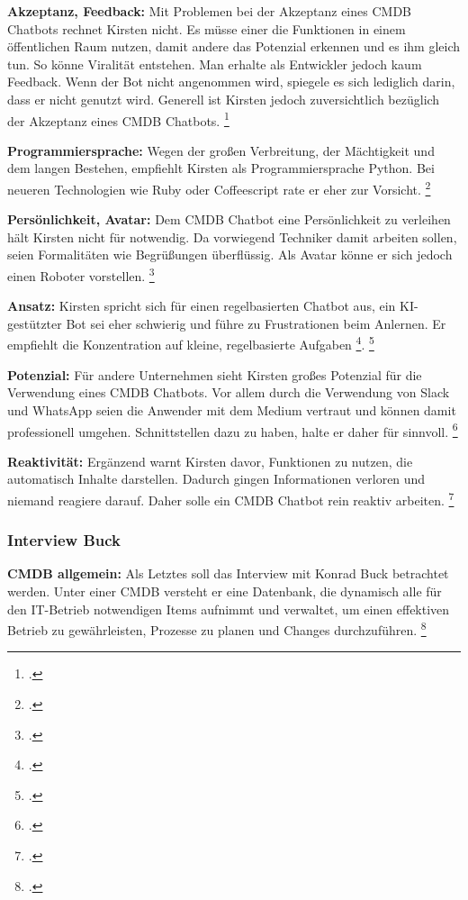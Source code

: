 \textbf{Akzeptanz, Feedback: }Mit Problemen bei der Akzeptanz eines \acs{CMDB} Chatbots rechnet Kirsten nicht. Es müsse einer die Funktionen in einem öffentlichen Raum nutzen, damit andere das Potenzial erkennen und es ihm gleich tun. So könne Viralität entstehen. Man erhalte als Entwickler jedoch kaum Feedback. Wenn der Bot nicht angenommen wird, spiegele es sich lediglich darin, dass er nicht genutzt wird. Generell ist Kirsten jedoch zuversichtlich bezüglich der Akzeptanz eines \acs{CMDB} Chatbots.
\footcite[Vgl.][o. \pno]{Kirsten_2019}

\textbf{Programmiersprache: }Wegen der großen Verbreitung, der Mächtigkeit und dem langen Bestehen, empfiehlt Kirsten als Programmiersprache Python. Bei neueren Technologien wie Ruby oder Coffeescript rate er eher zur Vorsicht. 
\footcite[Vgl.][o. \pno]{Kirsten_2019}

\textbf{Persönlichkeit, Avatar: }Dem CMDB Chatbot eine Persönlichkeit zu verleihen hält Kirsten nicht für notwendig. Da vorwiegend Techniker damit arbeiten sollen, seien Formalitäten wie Begrüßungen überflüssig. Als Avatar könne er sich jedoch einen Roboter vorstellen. 
\footcite[Vgl.][o. \pno]{Kirsten_2019}

\textbf{Ansatz: }Kirsten spricht sich für einen regelbasierten Chatbot aus, ein KI-gestützter Bot sei eher schwierig und führe zu Frustrationen beim Anlernen. Er empfiehlt die Konzentration auf \glqq{}kleine, regelbasierte Aufgaben\grqq
\footcite[][o. \pno]{Kirsten_2019}.{}
\footcite[Vgl.][o. \pno]{Kirsten_2019}

\textbf{Potenzial: }Für andere Unternehmen sieht Kirsten großes Potenzial für die Verwendung eines \acs{CMDB} Chatbots. Vor allem durch die Verwendung von Slack und WhatsApp seien die Anwender mit dem Medium vertraut und können damit professionell umgehen. Schnittstellen dazu zu haben, halte er daher für sinnvoll.
\footcite[Vgl.][o. \pno]{Kirsten_2019}

\textbf{Reaktivität: }Ergänzend warnt Kirsten davor, Funktionen zu nutzen, die automatisch Inhalte darstellen. Dadurch gingen Informationen verloren und niemand reagiere darauf. Daher solle ein \acs{CMDB} Chatbot rein reaktiv arbeiten. 
\footcite[Vgl.][o. \pno]{Kirsten_2019}



\subsubsection{Interview Buck}
\textbf{\acs{CMDB} allgemein: }Als Letztes soll das Interview mit Konrad Buck betrachtet werden. Unter einer \acs{CMDB} versteht er eine Datenbank, die dynamisch alle für den IT-Betrieb notwendigen Items aufnimmt und verwaltet, um einen effektiven Betrieb zu gewährleisten, Prozesse zu planen und Changes durchzuführen.
\footcite[Vgl.][o. \pno]{Buck_2019}

